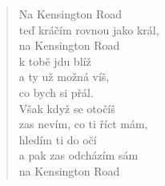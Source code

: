 \begin{multicols}{2}
\begin{verse}
Na Kensington Road\\
teď kráčím rovnou jako král,\\
na Kensington Road\\
k tobě jdu blíž\\
a ty už možná víš,\\
co bych si přál.\\
Však když se otočíš\\
zas nevím, co ti říct mám,\\
hledím ti do očí\\
a pak zas odcházím sám\\
na Kensington Road

\end{verse}


\end{multicols}